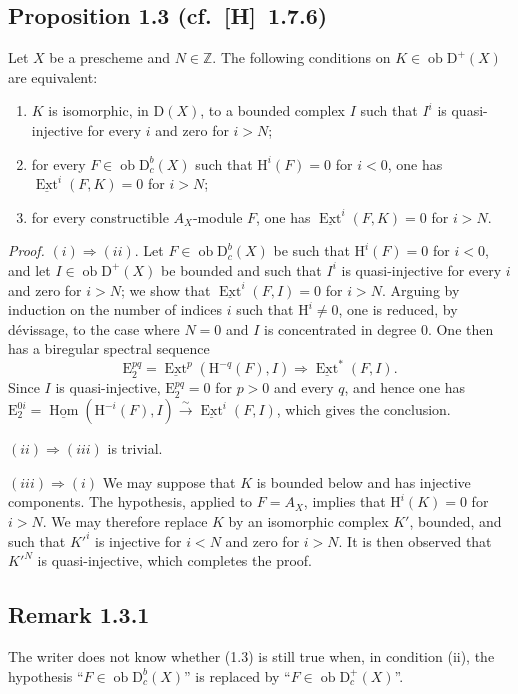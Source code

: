 \documentclass[11pt]{article}
\renewcommand{\H}{\mathrm{H}}
\DeclareMathOperator{\Hom}{Hom}
\DeclareMathOperator{\Ext}{Ext}
\newcommand{\D}{\mathrm{D}}
\newcommand{\Z}{\mathbb{Z}}
\newcommand{\E}{\mathrm{E}}
\newcommand{\ob}{\operatorname{ob}}
\providecommand{\Hom}{\operatorname{Hom}}
\providecommand{\ob}{\operatorname{ob}}
\providecommand{\Z}{\mathbb Z}
\begin{document}
\subsection*{Proposition 1.3 {\normalfont (cf.~[H]~1.7.6)}}
Let $X$ be a prescheme and $N \in \Z$. The following conditions on $K \in \ob \D^{+}(X)$ are equivalent:
\begin{enumerate}[label=(\roman*)]
\item $K$ is isomorphic, in $\D(X)$, to a bounded complex $I$ such that $I^i$ is quasi-injective for every $i$ and zero for $i > N$;
\item for every $F \in \ob \D_c^{b}(X)$ such that $\H^i(F) = 0$ for $i < 0$, one has $\underline{\Ext}^i(F,K) = 0$ for $i > N$;
\item for every constructible $A_X$-module $F$, one has $\underline{\Ext}^i(F,K) = 0$ for $i > N$.
\end{enumerate}

\emph{Proof.} $(i) \Rightarrow (ii)$. Let $F \in \ob \D_c^{b}(X)$ be such that $\H^i(F) = 0$ for $i < 0$, and let $I \in \ob \D^{+}(X)$ be bounded and such that $I^i$ is quasi-injective for every $i$ and zero for $i > N$; we show that $\underline{\Ext}^i(F,I) = 0$ for $i > N$. Arguing by induction on the number of indices $i$ such that $\H^i \neq 0$, one is reduced, by dévissage, to the case where $N = 0$ and $I$ is concentrated in degree $0$. One then has a biregular spectral sequence
\[
\E_2^{pq} = \underline{\Ext}^p(\H^{-q}(F),I) \Rightarrow \underline{\Ext}^{*}(F,I).
\]
Since $I$ is quasi-injective, $\E_2^{pq} = 0$ for $p > 0$ and every $q$, and hence one has $\E_2^{0i} = \underline{\Hom}(\H^{-i}(F),I) \xrightarrow{\sim} \underline{\Ext}^i(F,I)$, which gives the conclusion.

$(ii) \Rightarrow (iii)$ is trivial.

$(iii) \Rightarrow (i)$ We may suppose that $K$ is bounded below and has injective components. The hypothesis, applied to $F = A_X$, implies that $\H^i(K) = 0$ for $i > N$. We may therefore replace $K$ by an isomorphic complex $K'$, bounded, and such that $K'^i$ is injective for $i < N$ and zero for $i > N$. It is then observed that $K'^N$ is quasi-injective, which completes the proof.

\subsection*{Remark 1.3.1}
The writer does not know whether (1.3) is still true when, in condition (ii), the hypothesis ``$F \in \ob \D_c^{b}(X)$'' is replaced by ``$F \in \ob \D_c^{+}(X)$''.
\end{document}

